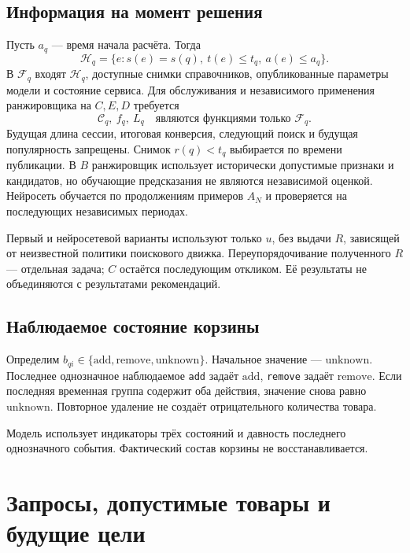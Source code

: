 \documentclass[12pt,a4paper]{article}
\newcommand{\code}[1]{{\ttfamily\small\nolinkurl{#1}}}
\theoremstyle{plainru}
\begin{document}
\subsection{Информация на момент решения}

Пусть \(a_q\) --- время начала расчёта. Тогда
\begin{equation}\label{eq:time-history}
\mathcal H_q=\{e:s(e)=s(q),\ t(e)\le t_q,\ a(e)\le a_q\}.
\end{equation}
В \(\mathcal F_q\) входят \(\mathcal H_q\), доступные снимки
справочников, опубликованные параметры модели и состояние сервиса.
Для обслуживания и независимого применения ранжировщика на $C,E,D$ требуется
\begin{equation}\label{eq:time-adapted}
\mathcal C_q,\ f_q,\ L_q\quad\text{являются функциями только }\mathcal F_q.
\end{equation}
Будущая длина сессии, итоговая конверсия, следующий поиск и будущая
популярность запрещены. Снимок \(r(q)<t_q\) выбирается по времени
публикации. В $B$ ранжировщик использует исторически допустимые признаки
и кандидатов, но обучающие предсказания не являются независимой оценкой.
Нейросеть обучается по продолжениям примеров \(A_N\) и проверяется
на последующих независимых периодах.

Первый и нейросетевой варианты используют только \(u\), без выдачи \(R\),
зависящей от неизвестной политики поискового движка.
Переупорядочивание полученного \(R\) --- отдельная задача;
\(C\) остаётся последующим откликом. Её результаты не объединяются
с результатами рекомендаций.

\subsection{Наблюдаемое состояние корзины}

Определим \(b_{qi}\in\{\mathrm{add},\mathrm{remove},\mathrm{unknown}\}\).
Начальное значение --- \(\mathrm{unknown}\). Последнее однозначное
наблюдаемое \code{add} задаёт \(\mathrm{add}\), \code{remove}
задаёт \(\mathrm{remove}\). Если последняя временная группа содержит
оба действия, значение снова равно \(\mathrm{unknown}\).
Повторное удаление не создаёт отрицательного количества товара.

Модель использует индикаторы трёх состояний и давность последнего
однозначного события. Фактический состав корзины не восстанавливается.

\section{Запросы, допустимые товары и будущие цели}\label{sec:requests}
\end{document}
